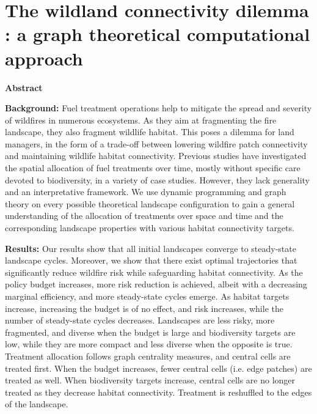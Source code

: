 \chapter{The wildland connectivity dilemma : a graph theoretical computational approach}

\begin{center}
\textbf{Abstract}\par
    \vspace*{.2cm}
    \noindent
    \begin{minipage}{0.9\textwidth}

\textbf{Background:} Fuel treatment operations help to mitigate the spread and severity of wildfires in numerous ecosystems. As they aim at fragmenting the fire landscape, they also fragment wildlife habitat. This poses a dilemma for land managers, in the form of a trade-off between lowering wildfire patch connectivity and maintaining wildlife habitat connectivity. Previous studies have investigated the spatial allocation of fuel treatments over time, mostly without specific care devoted to biodiversity, in a variety of case studies. However, they lack generality and an interpretative framework. We use dynamic programming and graph theory on every possible theoretical landscape configuration to gain a general understanding of the allocation of treatments over space and time and the corresponding landscape properties with various habitat connectivity targets. 
 
\textbf{Results:} Our results show that all initial landscapes converge to steady-state landscape cycles. Moreover, we show that there exist optimal trajectories that significantly reduce wildfire risk while safeguarding habitat connectivity. As the policy budget increases, more risk reduction is achieved, albeit with a decreasing marginal efficiency, and more steady-state cycles emerge. As habitat targets increase, increasing the budget is of no effect, and risk increases, while the number of steady-state cycles decreases. Landscapes are less risky, more fragmented, and diverse when the budget is large and biodiversity targets are low, while they are more compact and less diverse when the opposite is true. Treatment allocation follows graph centrality measures, and central cells are treated first. When the budget increases, fewer central cells (i.e. edge patches) are treated as well. When biodiversity targets increase, central cells are no longer treated as they decrease habitat connectivity. Treatment is reshuffled to the edges of the landscape.



\end{minipage}
\end{center}
